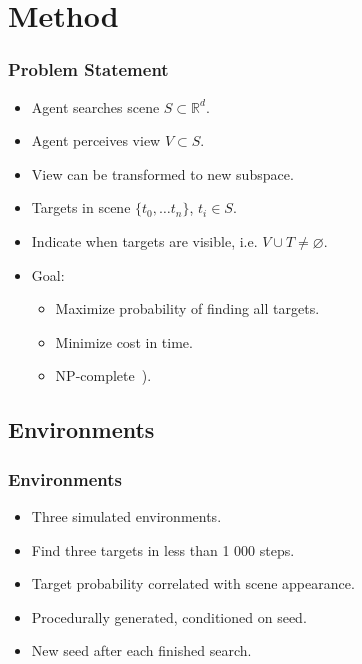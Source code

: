 \section{Method}

\begin{frame}
    \frametitle{Problem Statement}

    \begin{itemize}
        \item Agent searches scene \(S \subset \mathbb{R}^d\).
        \item Agent perceives view \(V \subset S\).
        \item View can be transformed to new subspace.
        \item Targets in scene \(\{t_0, \dots t_n\}\), \(t_i \in S\).
        \item Indicate when targets are visible, i.e. \(V \cup T \neq \varnothing\). 
        \item Goal:
        \begin{itemize}
            \item Maximize probability of finding all targets.
            \item Minimize cost in time.
            \item NP-complete~\cite{andreopoulos_theory_2009}). %
        \end{itemize}
    \end{itemize}
\end{frame}

\subsection{Environments}

\begin{frame}
    \frametitle{Environments}
    
    \begin{itemize}
        \item Three simulated environments.
        \item Find three targets in less than 1 000 steps.
        \item Target probability correlated with scene appearance. %
        \item Procedurally generated, conditioned on seed.
        \item New seed after each finished search.
    \end{itemize}
\end{frame}

